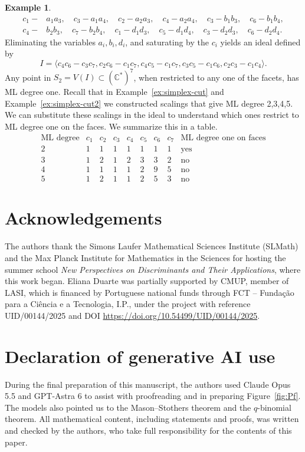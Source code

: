 \documentclass[12pt,reqno]{amsart}   	%
\theoremstyle{plain}
\theoremstyle{definition}
\newtheorem{example}[theorem]{Example}
\theoremstyle{remark}
\newcommand{\C}{\mathbb{C}}
\begin{document}
\begin{example}
\begin{align*}
    c_1-&a_1a_3,\quad c_3-a_1a_4,\quad c_2-a_2a_3,\quad c_4-a_2a_4, \quad c_3-b_1b_3,\quad c_6-b_1b_4, \\ 
c_4-&b_2b_3,\quad c_7-b_2b_4,\quad c_1-d_1d_3,\quad c_5-d_1d_4,\quad c_3-d_2d_3,\quad c_6-d_2d_4.
\end{align*}
Eliminating the variables  $a_i,b_i,d_i$, and saturating by the
$c_i$ yields an ideal defined by
\[I=\langle c_4c_6 - c_3c_7, c_2c_6 - c_1c_7, c_4c_5 - c_1c_7, c_3c_5 - c_1c_6, c_2c_3 - c_1c_4 \rangle.
\]
Any point in $S_2=V(I)\subset (\C^{\ast})^7$, when restricted to any one of the facets, has ML degree one. Recall that in Example~\ref{ex:simplex-cut} and
Example~\ref{ex:simplex-cut2} we constructed scalings that give ML degree 2,3,4,5. We can substitute these scalings in the ideal to understand which ones restrict to ML degree one on the faces. We summarize this in a table.
\[
\begin{array}{c|ccccccc|c}
\text{ML degree} & c_1 & c_2 & c_3 & c_4 & c_5 & c_6 & c_7 & \text{ML degree one on faces} \\
\hline
2 & 1 & 1 & 1 & 1 & 1 & 1 & 1 & \text{yes} \\
3 & 1 & 2 & 1 & 2 & 3 & 3 & 2 & \text{no}  \\
4 & 1 & 1 & 1 & 1 & 2 & 9 & 5 & \text{no}  \\
5 & 1 & 2 & 1 & 1 & 2 & 5 & 3 & \text{no}
\end{array}
\]
\end{example}

\section*{Acknowledgements}
The authors thank the Simons Laufer Mathematical Sciences Institute (SLMath) and the
Max Planck Institute for Mathematics in the Sciences for hosting the summer school
\emph{New Perspectives on Discriminants and Their Applications}, where this work began.
Eliana Duarte was partially supported by CMUP, member of LASI, which is financed by
Portuguese national funds through FCT -- Fundação para a Ciência e a Tecnologia, I.P.,
under the project with reference UID/00144/2025 and DOI
\url{https://doi.org/10.54499/UID/00144/2025}.
\section*{Declaration of generative AI use}
During the final preparation of this manuscript, the authors used Claude Opus 5.5 and GPT-Astra 6 to assist with proofreading and in preparing Figure~\ref{fig:Pf}. The models also pointed us to the
Mason--Stothers theorem and the $q$-binomial theorem. All mathematical content, including statements and
proofs, was written and checked by the authors, who take full responsibility for
the contents of this paper.


\end{document}
